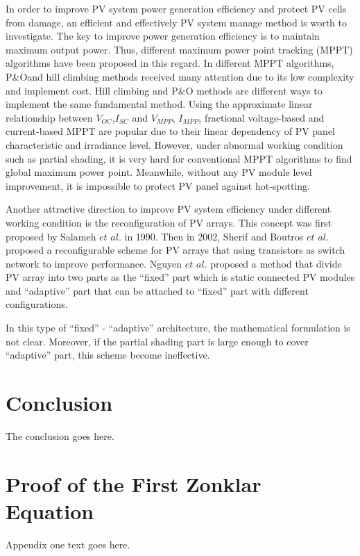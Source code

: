 \documentclass[journal]{IEEEtran}
\begin{document}
In order to improve PV system power generation efficiency and protect PV cells from damage, an efficient and effectively PV system manage method is worth to investigate.
The key to improve power generation efficiency is to maintain maximum output power.
Thus, different maximum power point tracking (MPPT) algorithms have been proposed in this regard.
In different MPPT algorithms, P\&O\cite{kasa2000maximum,jain2004new,chomsuwan2002photovoltaic,wasynezuk1983dynamic}and hill climbing\cite{koutroulis2001development,teulings1993new,xiao2004modified} methods received many attention due to its low complexity and implement cost.
Hill climbing and P\&O methods are different ways to implement the same fundamental method.
Using the approximate linear relationship between $V_{OC}$,$I_{SC}$ and $V_{MPP}$, $I_{MPP}$, fractional voltage-based and current-based MPPT are popular due to their linear dependency of PV panel characteristic and irradiance level\cite{Liu2016,kobayashi2004novel,bekker2004finding,mutoh2002prediction,noguchi2001short}.
However, under abnormal working condition such as partial shading, it is very hard for conventional MPPT algorithms to find global maximum power point.
Meanwhile, without any PV module level improvement, it is impossible to protect PV panel against hot-spotting\cite{Olalla2018,ghanbari2016permanent}.

Another attractive direction to improve PV system efficiency under different working condition is the reconfiguration of PV arrays.
This concept was first proposed by Salameh $et$ $al.$\cite{Salameh1990} in 1990.
Then in 2002, Sherif and Boutros $et$ $al.$ proposed a reconfigurable scheme for PV arrays that using transistors as switch network to improve performance\cite{sherif2002solar}.
Nguyen $et$ $al.$ proposed a method that divide PV array into two parts as the ``fixed'' part which is static connected PV modules and ``adaptive'' part that can be attached to ``fixed'' part with different configurations\cite{Nguyen2008}.

In this type of ``fixed'' - ``adaptive'' architecture, the mathematical formulation is not clear.
Moreover, if the partial shading part is large enough to cover ``adaptive'' part, this scheme become ineffective.
\section{Conclusion}
The conclusion goes here.



\appendices
\section{Proof of the First Zonklar Equation}
Appendix one text goes here.
\end{document}
